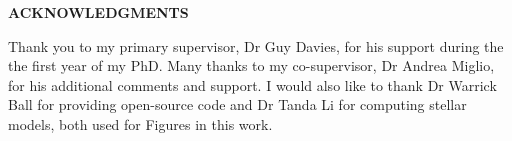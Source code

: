 \providecommand\phantomsection{} \phantomsection
\thispagestyle{plain}
\renewcommand{\baselinestretch}{1}\small\normalsize
\begin{center}
\vspace*{0.375in}
\textbf{ACKNOWLEDGMENTS}\\[3\baselineskip]
\end{center}
\renewcommand{\baselinestretch}{1.66} \small\normalsize%
Thank you to my primary supervisor, Dr Guy Davies, for his support during the the first year of my PhD. Many thanks to my co-supervisor, Dr Andrea Miglio, for his additional comments and support. I would also like to thank Dr Warrick Ball for providing open-source code and Dr Tanda Li for computing stellar models, both used for Figures in this work. 
\newpage